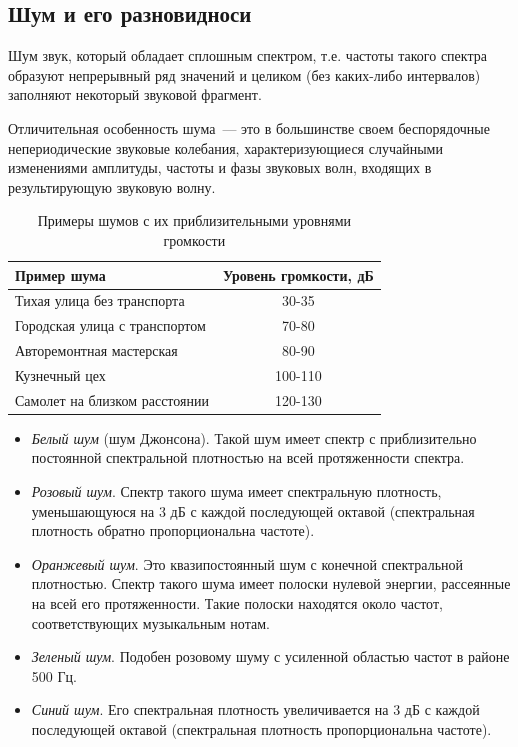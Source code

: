 \documentclass{beamer}
\begin{document}
\subsection{Шум и его разновидноси}
\begin{frame}
\begin{block}{Шум}
звук, который обладает сплошным спектром, т.е. частоты такого спектра образуют непрерывный ряд значений и целиком (без каких-либо интервалов) заполняют некоторый звуковой фрагмент.
\end{block}
Отличительная особенность шума~--- это в большинстве своем беспорядочные непериодические звуковые колебания, характеризующиеся случайными изменениями амплитуды, частоты и фазы звуковых волн, входящих в результирующую звуковую волну. 

\begin{table}
  \caption{Примеры шумов с их приблизительными уровнями громкости}
  \begin{center}
  \begin{tabular}{|l|c|}
  \hline Пример шума & Уровень громкости, дБ \\
  \hline Тихая улица без транспорта & 30-35 \\
  \hline Городская улица с транспортом & 70-80 \\  
  \hline Авторемонтная мастерская & 80-90 \\  
  \hline Кузнечный цех & 100-110 \\    
  \hline Самолет на близком расстоянии & 120-130 \\   
  \hline   
  \end{tabular}
  \end{center}  
  \label{table-noise-01}
\end{table}
\end{frame}

\begin{frame}
\begin{itemize}
\item {\itshape Белый шум} (шум Джонсона). Такой шум имеет спектр с приблизительно постоянной спектральной плотностью на всей протяженности спектра.
\item {\itshape Розовый шум}. Спектр такого шума имеет спектральную плотность, уменьшающуюся на 3 дБ с каждой последующей октавой (спектральная плотность обратно пропорциональна частоте).
\item {\itshape Оранжевый шум}. Это квазипостоянный шум с конечной спектральной плотностью. Спектр такого шума имеет полоски нулевой энергии, рассеянные на
всей его протяженности. Такие полоски находятся около частот, соответствующих музыкальным нотам.
\item {\itshape Зеленый шум}. Подобен розовому шуму с усиленной областью частот в районе 500 Гц.
\item {\itshape Синий шум}. Его спектральная плотность увеличивается на 3 дБ с каждой последующей октавой (спектральная плотность пропорциональна частоте).
\end{itemize}
\end{frame}
\end{document}
